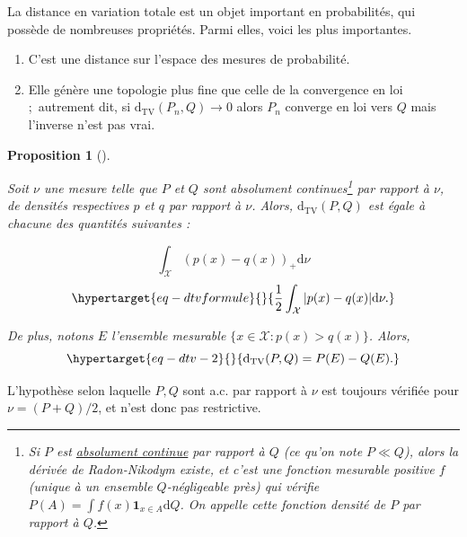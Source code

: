 \documentclass[
  10,
  letterpaper,
  DIV=11,
  numbers=noendperiod]{scrreport}
\providecommand{\tightlist}{%
  \setlength{\itemsep}{0pt}\setlength{\parskip}{0pt}}\usepackage{longtable,booktabs,array}
\newcommand{\dtv}{\mathrm{d}_{\mathrm{TV}}}
\theoremstyle{plain}
\theoremstyle{definition}
\theoremstyle{plain}
\newtheorem{proposition}{Proposition}[chapter]
\theoremstyle{definition}
\theoremstyle{definition}
\theoremstyle{plain}
\theoremstyle{remark}
\begin{document}
La distance en variation totale est un objet important en probabilités,
qui possède de nombreuses propriétés. Parmi elles, voici les plus
importantes.

\begin{enumerate}
\def\labelenumi{\arabic{enumi}.}
\tightlist
\item
  C'est une distance sur l'espace des mesures de probabilité.
\item
  Elle génère une topologie plus fine que celle de la convergence en loi
  ;~autrement dit, si \(\dtv(P_n, Q) \to 0\) alors \(P_n\) converge en
  loi vers \(Q\) mais l'inverse n'est pas vrai.
\end{enumerate}

\begin{proposition}[]\protect\hypertarget{prp-dtv}{}\label{prp-dtv}

Soit \(\nu\) une mesure telle que \(P\) et \(Q\) sont absolument
continues\footnote{Si \(P\) est
  \href{https://fr.wikipedia.org/wiki/Th\%C3\%A9or\%C3\%A8me_de_Radon-Nikodym-Lebesgue}{absolument
  continue} par rapport à \(Q\) (ce qu'on note \(P \ll Q\)), alors la
  dérivée de Radon-Nikodym existe, et c'est une fonction mesurable
  positive \(f\) (unique à un ensemble \(Q\)-négligeable près) qui
  vérifie \(P(A) = \int f(x)\mathbf{1}_{x\in A}\mathrm{d}Q\). On appelle
  cette fonction \emph{densité} de \(P\) par rapport à \(Q\).} par
rapport à \(\nu\), de densités respectives \(p\) et \(q\) par rapport à
\(\nu\). Alors, \(\dtv(P,Q)\) est égale à chacune des quantités
suivantes :

\[\int_{\mathcal{X}} (p(x) - q(x))_+\mathrm{d}\nu\]
\begin{equation}\protect\hypertarget{eq-dtvformule}{}{ \frac{1}{2}\int_{\mathcal{X}} |p(x) - q(x)|\mathrm{d}\nu.}\label{eq-dtvformule}\end{equation}

De plus, notons \(E\) l'ensemble mesurable
\(\{x \in \mathcal{X} : p(x)>q(x)\}\). Alors,
\begin{equation}\protect\hypertarget{eq-dtv-2}{}{\dtv(P,Q) = P(E) - Q(E).}\label{eq-dtv-2}\end{equation}

\end{proposition}

L'hypothèse selon laquelle \(P,Q\) sont a.c. par rapport à \(\nu\) est
toujours vérifiée pour \(\nu = (P+Q)/2\), et n'est donc pas restrictive.
\end{document}
